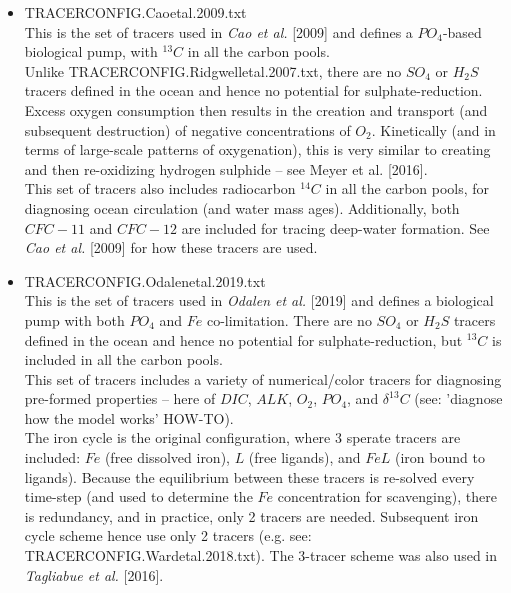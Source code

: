 \documentclass[11pt,fleqn]{book} %
\begin{document}
\begin{itemize}[noitemsep]
\vspace{2mm}
\item \textsf{\footnotesize TRACERCONFIG.Caoetal.2009.txt}
\vspace{1mm}
\\This is the set of tracers used in \textit{Cao et al.} [2009] and defines a \(PO_{4}\)-based biological pump, with \(^{13}C\) in all the carbon pools. \\Unlike \textsf{\footnotesize TRACERCONFIG.Ridgwelletal.2007.txt}, there are no \(SO_{4}\) or \(H_{2}S\) tracers defined in the ocean and hence no potential for sulphate-reduction. Excess oxygen consumption then results in the creation and transport (and subsequent destruction) of negative concentrations of \(O_{2}\). Kinetically (and in terms of large-scale patterns of oxygenation), this is very similar to creating and then re-oxidizing hydrogen sulphide -- see Meyer et al. [2016].
\\This set of tracers also includes radiocarbon \(^{14}C\) in all the carbon pools, for diagnosing ocean circulation (and water mass ages). Additionally, both \(CFC-11\) and \(CFC-12\) are included for tracing deep-water formation. See \textit{Cao et al.} [2009] for how these tracers are used.

\vspace{2mm}
\item \textsf{\footnotesize TRACERCONFIG.Odalenetal.2019.txt}
\vspace{1mm}
\\This is the set of tracers used in \textit{Odalen et al.} [2019] and defines a biological pump with both \(PO_{4}\) and \(Fe\) co-limitation. There are no \(SO_{4}\) or \(H_{2}S\) tracers defined in the ocean and hence no potential for sulphate-reduction, but \(^{13}C\) is included in all the carbon pools.
\\This set of tracers includes a variety of numerical/color tracers for diagnosing pre-formed properties -- here of \(DIC\), \(ALK\), \(O_{2}\), \(PO_{4}\), and \(\delta^{13}C\) (see: 'diagnose how the model works' HOW-TO).
\\The iron cycle is the original configuration, where 3 sperate tracers are included: \(Fe\) (free dissolved iron), \(L\) (free ligands), and \(FeL\) (iron bound to ligands). Because the equilibrium between these tracers is re-solved every time-step (and used to determine the \(Fe\) concentration for scavenging), there is redundancy, and in practice, only 2 tracers are needed. Subsequent iron cycle scheme hence use only 2 tracers (e.g. see: \textsf{\footnotesize TRACERCONFIG.Wardetal.2018.txt}). The 3-tracer scheme was also used in \textit{Tagliabue et al.} [2016].


\end{itemize}
\end{document}
